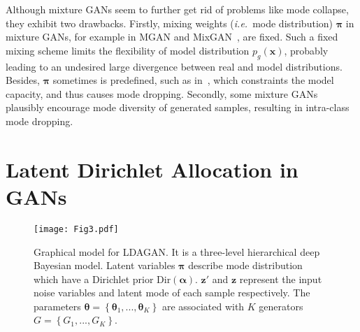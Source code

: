 \documentclass{article}
\def\ie{\emph{i.e.}}
\begin{document}
Although mixture GANs seem to further get rid of problems like mode collapse, they exhibit two drawbacks.
Firstly, mixing weights (\ie~mode distribution) $\bm{\pi}$ in mixture GANs, for example in MGAN and MixGAN~\cite{hoang2018mgan,arora2017generalization}, are fixed.
Such a fixed mixing scheme limits the flexibility of model distribution $p_g\left(\mathbf{x}\right)$, probably leading to an undesired large divergence between real and model distributions.
Besides, $\bm{\pi}$ sometimes is predefined, such as in~\cite{hoang2018mgan}, which constraints the model capacity, and thus causes mode dropping.
Secondly, some mixture GANs~\cite{hoang2018mgan} plausibly encourage mode diversity of generated samples, resulting in intra-class mode dropping.



\section{Latent Dirichlet Allocation in GANs}
\label{sec:LDAGAN}
\begin{figure}
  \centering
    \texttt{[image: Fig3.pdf]}
     \caption{Graphical model for LDAGAN. It is a three-level hierarchical deep Bayesian model. Latent variables $\bm{\pi}$ describe mode distribution which have a Dirichlet prior $\text{Dir}(\bm{\alpha})$. $\mathbf{z}'$ and $\mathbf{z}$ represent the input noise variables and latent mode of each sample respectively. The parameters $\bm{\theta}=\left\{\bm{\theta}_1,...,\bm{\theta}_K\right\}$ are associated with $K$ generators $G=\left\{G_1,...,G_K\right\}$. }
     \label{fig:LDA-GAN}
\end{figure}
\end{document}
